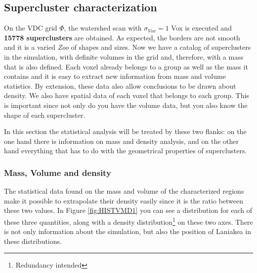 \documentclass[a4paper,fleqn,usenatbib]{mnras}
\begin{document}
\subsection{Supercluster characterization}

On the VDC grid $\Phi$, the watershed scan with $\sigma_{Vox} = 1$ Vox is executed and \textbf{15778 superclusters} are obtained. As expected, the borders are not smooth and it is a varied \emph{Zoo} of shapes and sizes. Now we have a catalog of superclusters in the simulation, with definite volumes in the grid and, therefore, with a mass that is also defined. Each voxel already belongs to a group as well as the mass it contains and it is easy to extract new information from mass and volume statistics. By extension, these data also allow conclusions to be drawn about density. We also have spatial data of each voxel that belongs to each group. This is important since not only do you have the volume data, but you also know the shape of each supercluster. 


In this section the statistical analysis will be treated by these two flanks: on the one hand there is information on mass and density analysis, and on the other hand everything that has to do with the geometrical properties of superclusters.

\subsubsection{Mass, Volume and density}

The statistical data found on the mass and volume of the characterized regions make it possible to extrapolate their density easily since it is the ratio between these two values. In Figure \ref{fig:HISTVMD1} you can see a distribution for each of these three quantities, along with a density distribution\footnote{Redundancy intended} on these two axes. There is not only information about the simulation, but also the position of Laniakea in these distributions.
\end{document}
